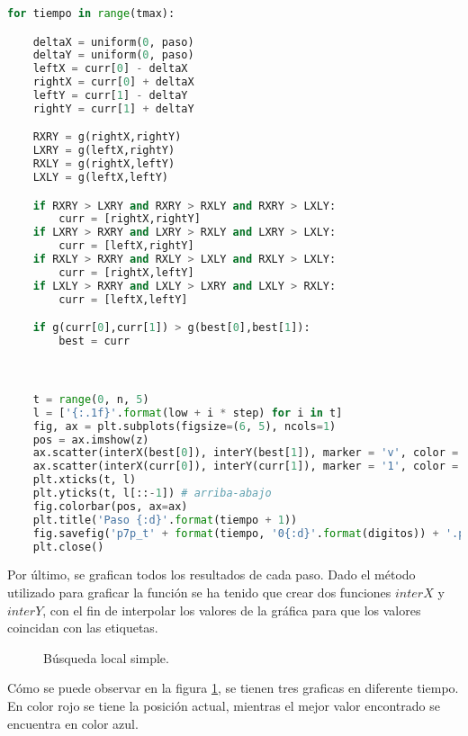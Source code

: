 \documentclass{article}
\begin{document}
\begin{lstlisting}[language=Python]
for tiempo in range(tmax):

    deltaX = uniform(0, paso)
    deltaY = uniform(0, paso)
    leftX = curr[0] - deltaX
    rightX = curr[0] + deltaX
    leftY = curr[1] - deltaY
    rightY = curr[1] + deltaY

    RXRY = g(rightX,rightY)
    LXRY = g(leftX,rightY)
    RXLY = g(rightX,leftY)
    LXLY = g(leftX,leftY)

    if RXRY > LXRY and RXRY > RXLY and RXRY > LXLY:
        curr = [rightX,rightY]
    if LXRY > RXRY and LXRY > RXLY and LXRY > LXLY:
        curr = [leftX,rightY]
    if RXLY > RXRY and RXLY > LXLY and RXLY > LXLY:
        curr = [rightX,leftY]
    if LXLY > RXRY and LXLY > LXRY and LXLY > RXLY:
        curr = [leftX,leftY]

    if g(curr[0],curr[1]) > g(best[0],best[1]):
        best = curr



    t = range(0, n, 5)
    l = ['{:.1f}'.format(low + i * step) for i in t]
    fig, ax = plt.subplots(figsize=(6, 5), ncols=1)
    pos = ax.imshow(z)
    ax.scatter(interX(best[0]), interY(best[1]), marker = 'v', color = '#0000ff')
    ax.scatter(interX(curr[0]), interY(curr[1]), marker = '1', color = 'red')
    plt.xticks(t, l)
    plt.yticks(t, l[::-1]) # arriba-abajo
    fig.colorbar(pos, ax=ax)
    plt.title('Paso {:d}'.format(tiempo + 1))
    fig.savefig('p7p_t' + format(tiempo, '0{:d}'.format(digitos)) + '.png')
    plt.close()
 \end{lstlisting}
 
 Por último, se grafican todos los resultados de cada paso. Dado el método utilizado para graficar la función se ha tenido que crear dos funciones $interX$ y $interY$, con el fin de interpolar los valores de la gráfica para que los valores coincidan con las etiquetas. 
 
\begin{figure}[H]
\centering
{}
\caption{B\'usqueda local simple.} 
\label{f1}
\end{figure}

Cómo se puede observar en la figura \ref{f1}, se tienen tres graficas en diferente tiempo. En color rojo se tiene la posición actual, mientras el mejor valor encontrado se encuentra en color azul.\\
\end{document}
